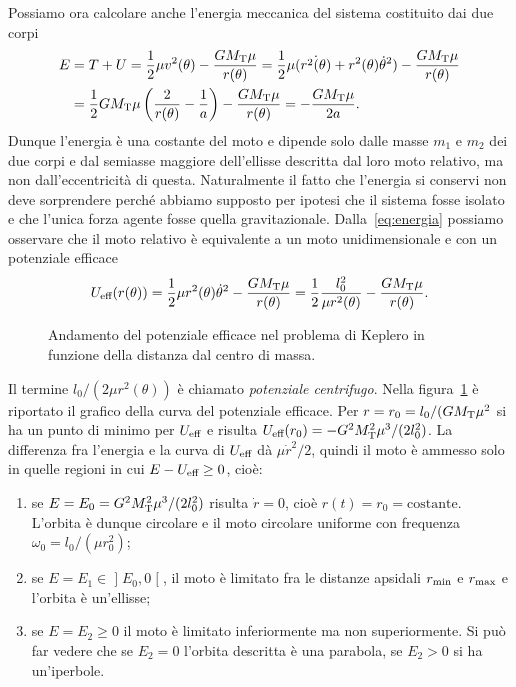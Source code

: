 Possiamo ora calcolare anche l'energia meccanica del sistema costituito dai due
corpi
\begin{equation}
  \label{eq:energia}
  \begin{split}
    E &= T + U = \frac{1}{2}\mu v^2(\theta) - \frac{GM_\textup{T}\mu}{r(\theta)}
    = \frac{1}{2}\mu(\dot{r^2(\theta)} + r^2(\theta)\dot{\theta}^2) -
    \frac{GM_\textup{T}\mu}{r(\theta)} \\
    &= \frac{1}{2}GM_\textup{T}\mu
    \left(
      \frac{2}{r(\theta)} - \frac{1}{a}
    \right) - \frac{GM_\textup{T}\mu}{r(\theta)} = -\frac{GM_\textup{T}\mu}{2a}.
  \end{split}
\end{equation}
Dunque l'energia è una costante del moto e dipende solo dalle masse $m_1$ e
$m_2$ dei due corpi e dal semiasse maggiore dell'ellisse descritta dal loro moto
relativo, ma non dall'eccentricità di questa. Naturalmente il fatto che
l'energia si conservi non deve sorprendere perché abbiamo supposto per ipotesi
che il sistema fosse isolato e che l'unica forza agente fosse quella
gravitazionale. %
Dalla~\eqref{eq:energia} possiamo osservare che il moto relativo è equivalente a
un moto unidimensionale e con un potenziale efficace
\begin{equation}
  U_\textup{eff}(r(\theta)) = \frac{1}{2}\mu r^2(\theta)\dot{\theta}^2 -
  \frac{GM_\textup{T}\mu}{r(\theta)} = \frac{1}{2}\frac{l_0^2}{\mu r^2(\theta)} -
  \frac{GM_\textup{T}\mu}{r(\theta)}.
\end{equation}
\begin{figure} %
  \centering
  
  \caption{Andamento del potenziale efficace nel problema di Keplero in funzione
    della distanza dal centro di massa.}
  \label{fig:potenziale-efficace}
\end{figure}
Il termine $l_0/(2\mu r^2(\theta))$ è chiamato \emph{potenziale
  centrifugo}. Nella figura~\ref{fig:potenziale-efficace} è riportato il grafico
della curva del potenziale efficace. Per $r=r_0=l_0/(GM_\textup{T}\mu^2$ si ha
un punto di minimo per $U_\textup{eff}$ e risulta $U_\textup{eff}(r_0) =
-G^2M_\textup{T}^2\mu^3/(2l_0^2)$. La differenza fra l'energia e la curva di
$U_\textup{eff}$ dà $\mu\dot{r}^2/2$, quindi il moto è ammesso solo in quelle
regioni in cui $E-U_\textup{eff}\geq 0$, cioè:
\begin{enumerate}
\item se $E = E_0 = G^2M_\textup{T}^2\mu^3/(2l_0^2)$ risulta $\dot{r}=0$, cioè
  $r(t) = r_0 = \text{costante}$. L'orbita è dunque circolare e il moto
  circolare uniforme con frequenza $\omega_0 = l_0/(\mu r_0^2)$;
\item se $E = E_1 \in \mathopen{]}E_0,0\mathclose{[}$, il moto è limitato fra le
  distanze apsidali $r_\textup{min}$ e $r_\textup{max}$ e l'orbita è un'ellisse;
\item se $E = E_2 \geq 0$ il moto è limitato inferiormente ma non
  superiormente. Si può far vedere che se $E_2 = 0$ l'orbita descritta è una
  parabola, se $E_2>0$ si ha un'iperbole.
\end{enumerate}
